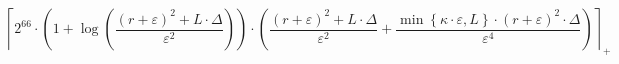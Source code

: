 \[\left\lceil 2^{66} \cdot \left(1 + \log\left(\frac{\left(r + \varepsilon\right)^{2} + L \cdot \Delta}{\varepsilon^{2}}\right)\right) \cdot \left(\frac{\left(r + \varepsilon\right)^{2} + L \cdot \Delta}{\varepsilon^{2}} + \frac{\min\left\{ \kappa \cdot \varepsilon, L \right\} \cdot \left(r + \varepsilon\right)^{2} \cdot \Delta}{\varepsilon^{4}}\right) \right\rceil_{+}\]
